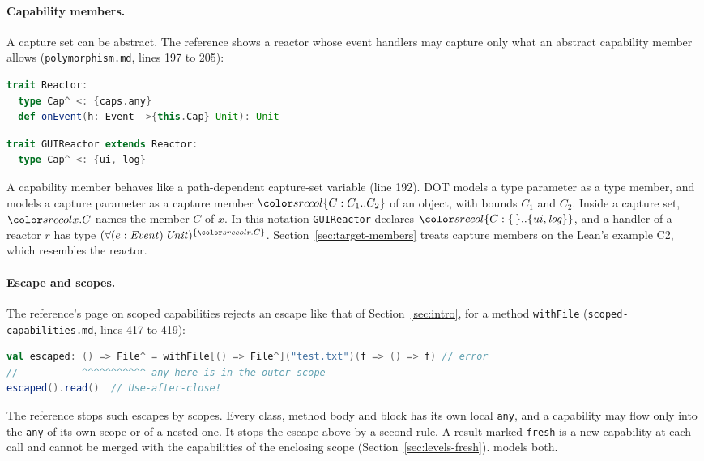 \paragraph{Capability members.}
A capture set can be abstract. The reference shows a reactor whose event handlers may capture only what an abstract capability member allows (\texttt{polymorphism.md}, lines 197 to 205):\par\nopagebreak
\noindent\begin{minipage}{\linewidth}
\begin{lstlisting}[language=Scala,belowskip=0pt]
trait Reactor:
  type Cap^ <: {caps.any}
  def onEvent(h: Event ->{this.Cap} Unit): Unit
\end{lstlisting}
\end{minipage}\par
\noindent\begin{minipage}{\linewidth}
\begin{lstlisting}[language=Scala]
trait GUIReactor extends Reactor:
  type Cap^ <: {ui, log}
\end{lstlisting}
\end{minipage}\par\noindent
A capability member behaves like a path-dependent capture-set variable (line 192). DOT models a type parameter as a type member, and \treeK models a capture parameter as a capture member $\dcap{C}{C_1}{C_2}$ of an object, with bounds $C_1$ and $C_2$. Inside a capture set, $\dsel{x}{C}$ names the member $C$ of $x$. In this notation \lstinline|GUIReactor| declares $\dcap{C}{\cempty}{\cset{\mathit{ui}, \mathit{log}}}$, and a handler of a reactor $r$ has type $\capt{(\forall(e : \mathit{Event})\,\Unit)}{\cset{\dsel{r}{C}}}$. Section~\ref{sec:target-members} treats capture members on the Lean's example C2, which resembles the reactor.

\paragraph{Escape and scopes.}
The reference's page on scoped capabilities rejects an escape like that of Section~\ref{sec:intro}, for a method \lstinline|withFile| (\texttt{scoped-capabilities.md}, lines 417 to 419):\par\nopagebreak
\noindent\begin{minipage}{\linewidth}
\begin{lstlisting}[language=Scala,basicstyle=\ttfamily\footnotesize,columns=fixed,basewidth=0.52em]
val escaped: () => File^ = withFile[() => File^]("test.txt")(f => () => f) // error
//           ^^^^^^^^^^^ any here is in the outer scope
escaped().read()  // Use-after-close!
\end{lstlisting}
\end{minipage}\par\noindent
The reference stops such escapes by scopes. Every class, method body and block has its own local \lstinline|any|, and a capability may flow only into the \lstinline|any| of its own scope or of a nested one. It stops the escape above by a second rule. A result marked \lstinline|fresh| is a new capability at each call and cannot be merged with the capabilities of the enclosing scope (Section~\ref{sec:levels-fresh}). \treeCC models both.

